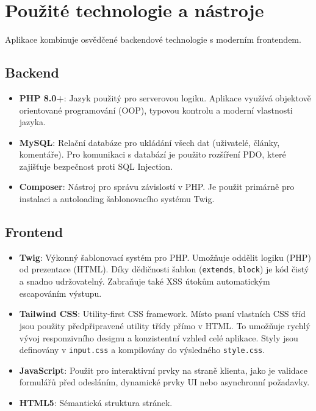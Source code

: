 \documentclass[12pt,a4paper]{article}
\begin{document}
\section{Použité technologie a nástroje}
Aplikace kombinuje osvědčené backendové technologie s moderním frontendem.

\subsection*{Backend}
\begin{itemize}
    \item \textbf{PHP 8.0+}: Jazyk použitý pro serverovou logiku. Aplikace využívá objektově orientované programování (OOP), typovou kontrolu a moderní vlastnosti jazyka.
    \item \textbf{MySQL}: Relační databáze pro ukládání všech dat (uživatelé, články, komentáře). Pro komunikaci s databází je použito rozšíření PDO, které zajišťuje bezpečnost proti SQL Injection.
    \item \textbf{Composer}: Nástroj pro správu závislostí v PHP. Je použit primárně pro instalaci a autoloading šablonovacího systému Twig.
\end{itemize}

\subsection*{Frontend}
\begin{itemize}
    \item \textbf{Twig}: Výkonný šablonovací systém pro PHP. Umožňuje oddělit logiku (PHP) od prezentace (HTML). Díky dědičnosti šablon (\texttt{extends}, \texttt{block}) je kód čistý a snadno udržovatelný. Zabraňuje také XSS útokům automatickým escapováním výstupu.
    \item \textbf{Tailwind CSS}: Utility-first CSS framework. Místo psaní vlastních CSS tříd jsou použity předpřipravené utility třídy přímo v HTML. To umožňuje rychlý vývoj responzivního designu a konzistentní vzhled celé aplikace. Styly jsou definovány v \texttt{input.css} a kompilovány do výsledného \texttt{style.css}.
    \item \textbf{JavaScript}: Použit pro interaktivní prvky na straně klienta, jako je validace formulářů před odesláním, dynamické prvky UI nebo asynchronní požadavky.
    \item \textbf{HTML5}: Sémantická struktura stránek.
\end{itemize}

\newpage
\end{document}
